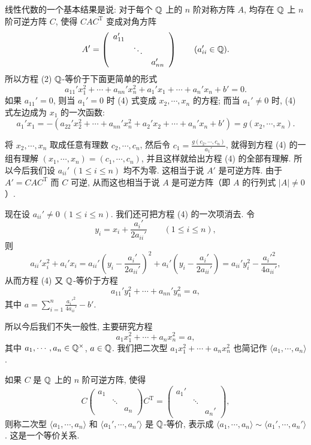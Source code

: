 线性代数的一个基本结果是说: 对于每个 $\mathbb{Q}$ 上的 $n$ 阶对称方阵 $A$, 均存在 $\mathbb{Q}$ 上 $n$ 阶可逆方阵 $C$, 使得 $CAC^{\mathrm{T}}$ 变成对角方阵
\[
  A'=\left(\begin{array}{ccc}a_{11}'& &\\ & \ddots &\\ & & a_{nn}'\end{array}\right)
  \qquad(a_{ii}'\in\mathbb{Q}).
\]
所以方程 (2) $\mathbb{Q}$-等价于下面更简单的形式
\begin{equation}\tag{4}
  a_{11}'x_1^2+\cdots+a_{nn}'x_n^2+a_1'x_1+\cdots+a_n'x_n+b'=0.
\end{equation}
如果 $a_{11}'=0$, 则当 $a_1'=0$ 时 (4) 式变成 $x_2,\cdots,x_n$ 的方程; 而当 $a_1'\neq 0$ 时, (4) 式左边成为 $x_1$ 的一次函数:
\[
  a_1'x_1=-\left(a_{22}'x_2^2+\cdots+a_{nn}'x_n^2+a_2'x_2+\cdots+a_n'x_n+b'\right)
  =g(x_2,\cdots,x_n).
\]
\begin{sloppypar}
将 $x_2,\cdots,x_n$ 取成任意有理数 $c_2,\cdots,c_n$, 然后令 $c_1=\frac{g(c_2,\cdots,c_n)}{a_1'}$, 就得到方程 (4) 的一组有理解 $(x_1,\cdots,x_n)=(c_1,\cdots,c_n)$, 并且这样就给出方程 (4) 的全部有理解. 所以今后我们设 $a_{ii}'\ (1\leqslant i\leqslant n)$ 均不为零. 这相当于说 $A'$ 是可逆方阵. 由于 $A'=CAC^{\mathrm{T}}$ 而 $C$ 可逆, 从而这也相当于说 $A$ 是可逆方阵（即 $A$ 的行列式 $|A|\neq 0$）.
\end{sloppypar}

现在设 $a_{ii}'\neq 0\ (1\leqslant i\leqslant n)$. 我们还可把方程 (4) 的一次项消去. 令
\begin{equation}\tag{5}
  y_i=x_i+\frac{a_i'}{2a_{ii}'}\qquad(1\leqslant i\leqslant n),
\end{equation}
则
\[
  a_{ii}'x_i^2+a_i'x_i
  =a_{ii}'\left(y_i-\frac{a_i'}{2a_{ii}'}\right)^2
  +a_i'\left(y_i-\frac{a_i'}{2a_{ii}'}\right)
  =a_{ii}'y_i^2-\frac{a_i'^2}{4a_{ii}'},
\]
从而方程 (4) 又 $\mathbb{Q}$-等价于方程
\begin{equation}\tag{6}
  a_{11}'y_1^2+\cdots+a_{nn}'y_n^2=a,
\end{equation}
其中 $a=\sum_{i=1}^{n}\frac{a_i'^2}{4a_{ii}'}-b'$.

所以今后我们不失一般性, 主要研究方程
\begin{equation}\tag{7}
  a_1x_1^2+\cdots+a_nx_n^2=a,
\end{equation}
其中 $a_1,\cdots,a_n\in\mathbb{Q}^{\times}$, $a\in\mathbb{Q}$. 我们把二次型 $a_1x_1^2+\cdots+a_nx_n^2$ 也简记作 $\langle a_1,\cdots,a_n\rangle$.

如果 $C$ 是 $\mathbb{Q}$ 上的 $n$ 阶可逆方阵, 使得
\[
  C\left(\begin{array}{ccc}a_1& &\\ & \ddots &\\ & & a_n\end{array}\right)
  C^{\mathrm{T}}
  =\left(\begin{array}{ccc}a_1'& &\\ & \ddots &\\ & & a_n'\end{array}\right),
\]
则称二次型 $\langle a_1,\cdots,a_n\rangle$ 和 $\langle a_1',\cdots,a_n'\rangle$ 是 $\mathbb{Q}$-等价, 表示成 $\langle a_1,\cdots,a_n\rangle\sim\langle a_1',\cdots,a_n'\rangle$. 这是一个等价关系.

